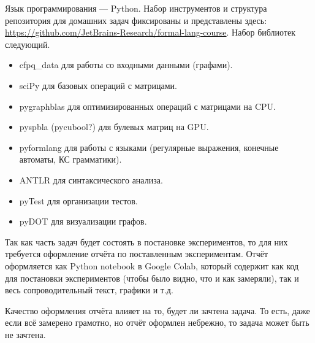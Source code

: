 Язык программирования --- Python. Набор инструментов и структура репозитория для домашних задач фиксированы и представлены здесь: \url{https://github.com/JetBrains-Research/formal-lang-course}. 
Набор библиотек следующий.
\begin{itemize}
    \item cfpq\_data для работы со входными данными (графами).
    \item sciPy для базовых операций с матрицами.
    \item pygraphblas для оптимизированных операций с матрицами на CPU.
    \item pyspbla (pycubool?) для булевых матриц на GPU.
    \item pyformlang для работы с языками (регулярные выражения, конечные автоматы, КС грамматики).
    \item ANTLR для синтаксического анализа.
    \item pyTest для организации тестов.
    \item pyDOT для визуализации графов.
\end{itemize}

Так как часть задач будет состоять в постановке экспериментов, то для них требуется оформление отчёта по поставленным экспериментам. 
Отчёт оформляется как Python notebook в Google Colab, который содержит как код для постановки экспериментов (чтобы было видно, что и как замеряли), так и весь сопроводительный текст, графики и т.д.

Качество оформления отчёта влияет на то, будет ли зачтена задача. То есть, даже если всё замерено грамотно, но отчёт оформлен небрежно, то задача может быть не зачтена.

